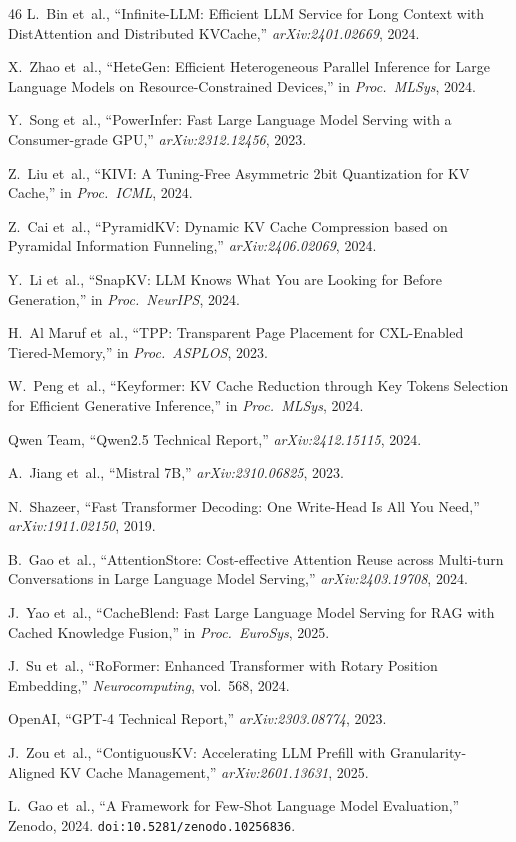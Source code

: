 \documentclass[conference]{IEEEtran}
\begin{document}
\begin{thebibliography}{46}
 L.~Bin et~al., ``Infinite-LLM: Efficient LLM Service for Long Context with DistAttention and Distributed KVCache,'' \textit{arXiv:2401.02669}, 2024.

 X.~Zhao et~al., ``HeteGen: Efficient Heterogeneous Parallel Inference for Large Language Models on Resource-Constrained Devices,'' in \textit{Proc.\ MLSys}, 2024.

 Y.~Song et~al., ``PowerInfer: Fast Large Language Model Serving with a Consumer-grade GPU,'' \textit{arXiv:2312.12456}, 2023.

 Z.~Liu et~al., ``KIVI: A Tuning-Free Asymmetric 2bit Quantization for KV Cache,'' in \textit{Proc.\ ICML}, 2024.

 Z.~Cai et~al., ``PyramidKV: Dynamic KV Cache Compression based on Pyramidal Information Funneling,'' \textit{arXiv:2406.02069}, 2024.

 Y.~Li et~al., ``SnapKV: LLM Knows What You are Looking for Before Generation,'' in \textit{Proc.\ NeurIPS}, 2024.

 H.~Al Maruf et~al., ``TPP: Transparent Page Placement for CXL-Enabled Tiered-Memory,'' in \textit{Proc.\ ASPLOS}, 2023.

 W.~Peng et~al., ``Keyformer: KV Cache Reduction through Key Tokens Selection for Efficient Generative Inference,'' in \textit{Proc.\ MLSys}, 2024.

 Qwen Team, ``Qwen2.5 Technical Report,'' \textit{arXiv:2412.15115}, 2024.

 A.~Jiang et~al., ``Mistral 7B,'' \textit{arXiv:2310.06825}, 2023.

 N.~Shazeer, ``Fast Transformer Decoding: One Write-Head Is All You Need,'' \textit{arXiv:1911.02150}, 2019.


 B.~Gao et~al., ``AttentionStore: Cost-effective Attention Reuse across Multi-turn Conversations in Large Language Model Serving,'' \textit{arXiv:2403.19708}, 2024.

 J.~Yao et~al., ``CacheBlend: Fast Large Language Model Serving for RAG with Cached Knowledge Fusion,'' in \textit{Proc.\ EuroSys}, 2025.

 J.~Su et~al., ``RoFormer: Enhanced Transformer with Rotary Position Embedding,'' \textit{Neurocomputing}, vol.~568, 2024.

 OpenAI, ``GPT-4 Technical Report,'' \textit{arXiv:2303.08774}, 2023.

 J.~Zou et~al., ``ContiguousKV: Accelerating LLM Prefill with Granularity-Aligned KV Cache Management,'' \textit{arXiv:2601.13631}, 2025.

 L.~Gao et~al., ``A Framework for Few-Shot Language Model Evaluation,'' Zenodo, 2024. \texttt{doi:10.5281/zenodo.10256836}.

\end{thebibliography}
\end{document}
